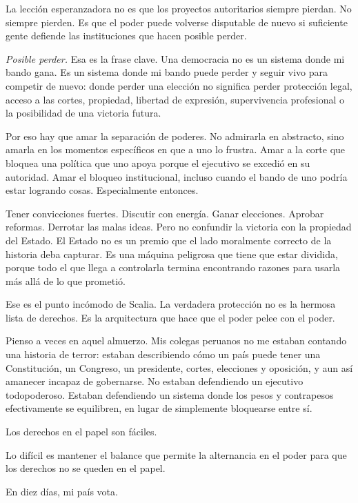 \documentclass[11pt,letterpaper]{article}
\begin{document}
La lección esperanzadora no es que los proyectos autoritarios siempre pierdan. No siempre pierden. Es que el poder puede volverse disputable de nuevo si suficiente gente defiende las instituciones que hacen posible perder.

\textit{Posible perder.} Esa es la frase clave. Una democracia no es un sistema donde mi bando gana. Es un sistema donde mi bando puede perder y seguir vivo para competir de nuevo: donde perder una elección no significa perder protección legal, acceso a las cortes, propiedad, libertad de expresión, supervivencia profesional o la posibilidad de una victoria futura.

Por eso hay que amar la separación de poderes. No admirarla en abstracto, sino amarla en los momentos específicos en que a uno lo frustra. Amar a la corte que bloquea una política que uno apoya porque el ejecutivo se excedió en su autoridad. Amar el bloqueo institucional, incluso cuando el bando de uno podría estar logrando cosas. Especialmente entonces.

Tener convicciones fuertes. Discutir con energía. Ganar elecciones. Aprobar reformas. Derrotar las malas ideas. Pero no confundir la victoria con la propiedad del Estado. El Estado no es un premio que el lado moralmente correcto de la historia deba capturar. Es una máquina peligrosa que tiene que estar dividida, porque todo el que llega a controlarla termina encontrando razones para usarla más allá de lo que prometió.

Ese es el punto incómodo de Scalia. La verdadera protección no es la hermosa lista de derechos. Es la arquitectura que hace que el poder pelee con el poder.

Pienso a veces en aquel almuerzo. Mis colegas peruanos no me estaban contando una historia de terror: estaban describiendo cómo un país puede tener una Constitución, un Congreso, un presidente, cortes, elecciones y oposición, y aun así amanecer incapaz de gobernarse. No estaban defendiendo un ejecutivo todopoderoso. Estaban defendiendo un sistema donde los pesos y contrapesos efectivamente se equilibren, en lugar de simplemente bloquearse entre sí.

Los derechos en el papel son fáciles.

Lo difícil es mantener el balance que permite la alternancia en el poder para que los derechos no se queden en el papel.

En diez días, mi país vota.
\end{document}
